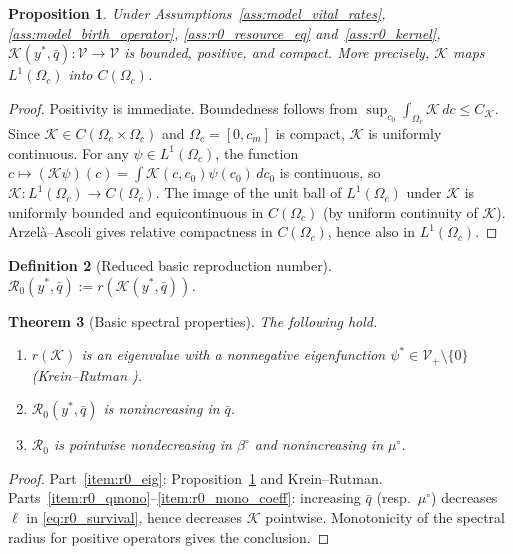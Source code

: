 \documentclass[pdflatex,sn-mathphys-num]{sn-jnl}%
\newtheorem{theorem}{Theorem}[section]
\newtheorem{proposition}[theorem]{Proposition}
\newtheorem{definition}[theorem]{Definition}
\begin{document}
\begin{proposition}\label{prop:r0_compact}
Under Assumptions~\ref{ass:model_vital_rates}, \ref{ass:model_birth_operator}, \ref{ass:r0_resource_eq} and~\ref{ass:r0_kernel},
\(\mathcal K(y^\ast,\bar q):\mathcal V\to\mathcal V\) is bounded, positive, and compact.
More precisely, \(\mathcal K\) maps \(L^1(\Omega_c)\) into \(C(\Omega_c)\).
\end{proposition}
\begin{proof}
Positivity is immediate. Boundedness follows from
\(\sup_{c_0}\int_{\Omega_c}\mathscr K\,dc\le C_{\mathscr K}\).
Since \(\mathscr K\in C(\Omega_c\times\Omega_c)\) and \(\Omega_c=[0,c_m]\) is compact,
\(\mathscr K\) is uniformly continuous. For any \(\psi\in L^1(\Omega_c)\),
the function \(c\mapsto(\mathcal K\psi)(c)=\int\mathscr K(c,c_0)\psi(c_0)\,dc_0\) is
continuous, so \(\mathcal K:L^1(\Omega_c)\to C(\Omega_c)\).
The image of the unit ball of \(L^1(\Omega_c)\) under \(\mathcal K\) is uniformly bounded
and equicontinuous in \(C(\Omega_c)\) (by uniform continuity of \(\mathscr K\)).
Arzel\`a--Ascoli gives relative compactness in \(C(\Omega_c)\),
hence also in \(L^1(\Omega_c)\).
\end{proof}

\begin{definition}[Reduced basic reproduction number]\label{def:r0}
\(\mathcal R_0(y^\ast,\bar q):=r(\mathcal K(y^\ast,\bar q))\).
\end{definition}

\begin{theorem}[Basic spectral properties]\label{thm:r0_basic}
The following hold.
\begin{enumerate}[label=\textup{(\alph*)}]
\item\label{item:r0_eig}
\(r(\mathcal K)\) is an eigenvalue with a nonnegative eigenfunction
\(\psi^\ast\in\mathcal V_+\setminus\{0\}\)
\textup{(Krein--Rutman \cite{KreinRutman1948,yu2026beyond,phat1994kreuin})}.
\item\label{item:r0_qmono}
\(\mathcal R_0(y^\ast,\bar q)\) is nonincreasing in \(\bar q\).
\item\label{item:r0_mono_coeff}
\(\mathcal R_0\) is pointwise nondecreasing in \(\beta^\circ\) and nonincreasing in
\(\mu^\circ\).
\end{enumerate}
\end{theorem}
\begin{proof}
Part~\ref{item:r0_eig}: Proposition~\ref{prop:r0_compact} and Krein--Rutman.
Parts~\ref{item:r0_qmono}--\ref{item:r0_mono_coeff}: increasing \(\bar q\) (resp.\
\(\mu^\circ\)) decreases \(\ell\) in \eqref{eq:r0_survival}, hence decreases \(\mathscr K\)
pointwise. Monotonicity of the spectral radius for positive operators gives the
conclusion.
\end{proof}
\end{document}
